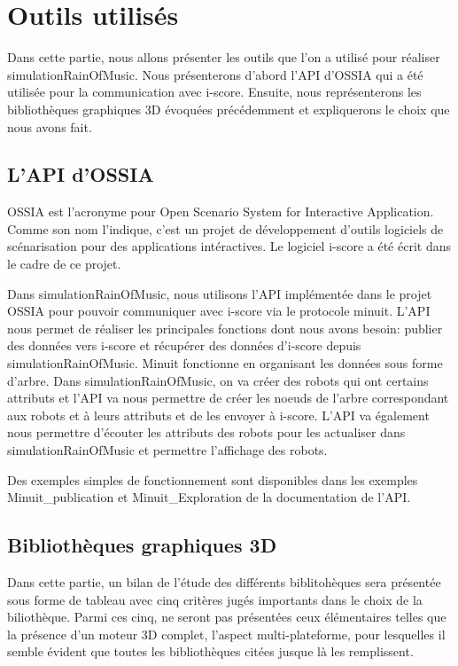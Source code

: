 \section{Outils utilisés}

Dans cette partie, nous allons présenter les outils que l'on a utilisé pour réaliser simulationRainOfMusic. Nous présenterons d'abord l'API d'OSSIA qui a été utilisée pour la communication avec i-score. Ensuite, nous représenterons les bibliothèques graphiques 3D évoquées précédemment et expliquerons le choix que nous avons fait.

\subsection{L'API d'OSSIA}

OSSIA est l'acronyme pour Open Scenario System for Interactive Application. Comme son nom l'indique, c'est un projet de développement d'outils logiciels de scénarisation pour des applications intéractives. Le logiciel i-score a été écrit dans le cadre de ce projet. 

Dans simulationRainOfMusic, nous utilisons l'API implémentée dans le projet OSSIA pour pouvoir communiquer avec i-score via le protocole minuit. L'API nous permet de réaliser les principales fonctions dont nous avons besoin: publier des données vers i-score et récupérer des données d'i-score depuis simulationRainOfMusic.  Minuit fonctionne en organisant les données sous forme d'arbre. Dans simulationRainOfMusic, on va créer des robots qui ont certains attributs et l'API va nous permettre de créer les noeuds de l'arbre correspondant aux robots et à leurs attributs et de les envoyer à i-score. L'API va également nous permettre d'écouter les attributs des robots pour les actualiser dans simulationRainOfMusic et permettre l'affichage des robots. 

Des exemples simples de fonctionnement sont disponibles dans les exemples Minuit\_publication et Minuit\_Exploration de la documentation de l'API.

\subsection{Bibliothèques graphiques 3D}

Dans cette partie, un bilan de l'étude des différents biblitohèques sera présentée sous forme de tableau avec cinq critères jugés importants dans le choix de la biliothèque. Parmi ces cinq, ne seront pas présentées ceux élémentaires telles que la présence d'un moteur 3D complet, l'aspect multi-plateforme, pour lesquelles il semble évident que toutes les bibliothèques citées jusque là les remplissent.


